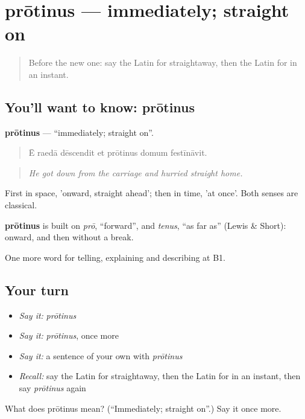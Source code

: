 \section[prōtinus]{prōtinus — immediately; straight on}

\label{lesson:LA-C292-protinus}



\begin{quote}
Before the new one: say the Latin for straightaway, then the Latin for in an instant.
\end{quote}

\subsection*{You'll want to know: prōtinus}
\textbf{prōtinus} — \textquotedblleft{}immediately; straight on\textquotedblright{}.

\begin{quote}
Ē raedā dēscendit et prōtinus domum festīnāvit.
\end{quote}

\begin{quote}
\emph{He got down from the carriage and hurried straight home.}
\end{quote}

First in space, 'onward, straight ahead'; then in time, 'at once'. Both senses are classical.

\begin{cousinweb}
\textbf{prōtinus} is built on \emph{prō}, \textquotedblleft{}forward\textquotedblright{}, and \emph{tenus}, \textquotedblleft{}as far as\textquotedblright{} (Lewis \& Short): onward, and then without a break.
\end{cousinweb}

\begin{grammarlens}[title={What you've built}]
One more word for telling, explaining and describing at B1.
\end{grammarlens}

\subsection*{Your turn}
\begin{itemize}
\raggedright
  \item \emph{Say it:} \emph{prōtinus}
  \item \emph{Say it:} \emph{prōtinus}, once more
  \item \emph{Say it:} a sentence of your own with \emph{prōtinus}
  \item \emph{Recall:} say the Latin for straightaway, then the Latin for in an instant, then say \emph{prōtinus} again
\end{itemize}

\begin{tcolorbox}[breakable,colback=teal!4,colframe=teal!35!black,title={Before you move on}]
What does prōtinus mean? (\textquotedblleft{}Immediately; straight on\textquotedblright{}.) Say it once more.
\end{tcolorbox}

